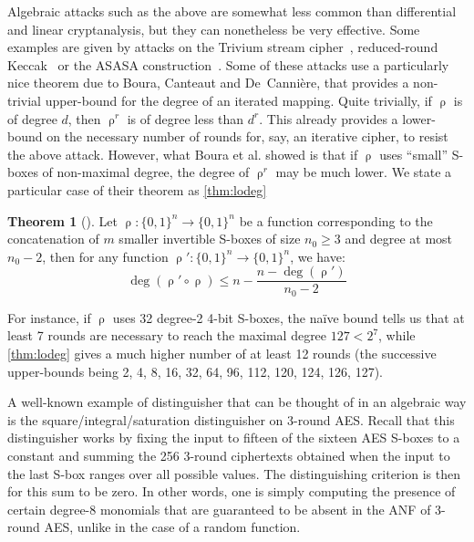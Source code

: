 \documentclass[11pt,a4paper]{article}
\theoremstyle{definition}
\theoremstyle{theorem}
\newtheorem{thm}{Theorem}
\DeclareMathOperator\rf{\rho}
\newcommand\msb{\{0,1\}^n}
\begin{document}
Algebraic attacks such as the above are somewhat less common than differential and linear cryptanalysis, but they can nonetheless be very effective.
Some examples are given by attacks on the Trivium stream cipher~\cite{DBLP:conf/eurocrypt/DinurS09,DBLP:conf/fse/FouqueV13},
reduced-round Keccak~\cite{DBLP:conf/fse/BouraCC11} or the ASASA construction~\cite{DBLP:conf/asiacrypt/MinaudDFK15,DBLP:journals/iacr/BiryukovK15a}.
Some of these attacks use a particularly nice theorem due to Boura, Canteaut and De~Cannière, that provides a non-trivial upper-bound for
the degree of an iterated mapping. Quite trivially, if $\rf$ is of degree $d$, then $\rf^r$ is of degree less than $d^r$. This already
provides a lower-bound on the necessary number of rounds for, say, an iterative cipher, to resist the above attack. However, what Boura et al.
showed is that if $\rf$ uses ``small'' S-boxes of non-maximal degree, the degree of $\rf^r$ may be much lower. We state a particular case of their theorem as
\autoref{thm:lodeg}
\begin{thm}[\cite{DBLP:conf/fse/BouraCC11}]
\label{thm:lodeg}
Let $\rf : \msb \rightarrow \msb$ be a function corresponding to the concatenation of $m$ smaller invertible S-boxes of size $n_0 \geq 3$
and degree at most $n_0 - 2$, then for any function $\rf' : \msb \rightarrow \msb$, we have:
\[
\deg(\rf' \circ \rf) \leq n - \frac{n - \deg(\rf')}{n_0 - 2}
\]
\end{thm}
For instance, if $\rf$ uses 32 degree-2 4-bit S-boxes, the naïve bound tells us that at least 7 rounds are necessary to reach
the maximal degree $127 < 2^7$, while \autoref{thm:lodeg} gives a much higher number of at least 12 rounds (the successive
upper-bounds being 2, 4, 8, 16, 32, 64, 96, 112, 120, 124, 126, 127). 

\medskip

A well-known example of distinguisher that can be thought of in an algebraic way is the square/integral/saturation
distinguisher on 3-round AES. Recall that this distinguisher works by fixing the input to fifteen of the sixteen AES S-boxes
to a constant and summing the 256 3-round ciphertexts obtained when the input to the last S-box ranges over all possible values.
The distinguishing criterion is then for this sum to be zero. In other words, one is simply computing the presence of
certain degree-8 monomials that are guaranteed to be absent in the ANF of 3-round AES, unlike in the case of a random function.
\end{document}
